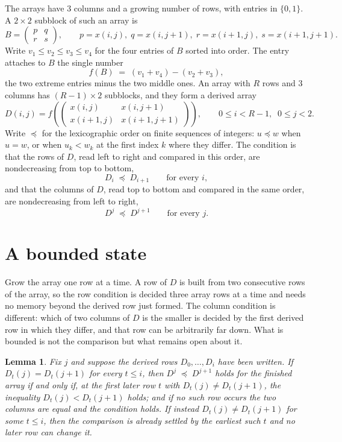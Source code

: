 \documentclass[11pt,a4paper]{article}
\theoremstyle{plain}
\newtheorem{lemma}[theorem]{Lemma}
\theoremstyle{definition}
\begin{document}
The arrays have $3$ columns and a growing number of rows, with entries in $\{0,1\}$. A
$2\times2$ subblock of such an array is
\[
B=\begin{pmatrix} p & q \\ r & s \end{pmatrix},
\qquad p=x(i,j),\; q=x(i,j+1),\; r=x(i+1,j),\; s=x(i+1,j+1).
\]
Write $v_1\le v_2\le v_3\le v_4$ for the four entries of $B$ sorted into order. The entry attaches to $B$ the single number
\[
f(B)\;=\;(v_1+v_4)-(v_2+v_3),
\]
the two extreme entries minus the two middle ones. An array with $R$ rows and $3$ columns has $(R-1)\times2$ subblocks, and they
form a derived array
\[
D(i,j)=f\!\left(\begin{pmatrix} x(i,j) & x(i,j+1) \\ x(i+1,j) & x(i+1,j+1)\end{pmatrix}
\right),\qquad 0\le i<R-1,\;\; 0\le j<2 .
\]
Write $\preceq$ for the lexicographic order on finite sequences of integers: $u\preceq w$ when
$u=w$, or when $u_k<w_k$ at the first index $k$ where they differ. The condition is that the
rows of $D$, read left to right and compared in this order, are nondecreasing from top to bottom,
\[
D_{i}\;\preceq\;D_{i+1}\qquad\text{for every } i,
\]
and that the columns of $D$, read top to bottom and compared in the same order, are nondecreasing
from left to right,
\[
D^{j}\;\preceq\;D^{j+1}\qquad\text{for every } j .
\]

\section{A bounded state}

Grow the array one row at a time. A row of $D$ is built from two consecutive rows of the array,
so the row condition is decided three array rows at a time and needs no memory beyond the
derived row just formed. The column condition is different: which of two columns of $D$ is the
smaller is decided by the first derived row in which they differ, and that row can be
arbitrarily far down. What is bounded is not the comparison but what remains open about it.

\begin{lemma}\label{lem:bits}
Fix $j$ and suppose the derived rows $D_0,\dots,D_i$ have been written. If $D_t(j)=D_t(j+1)$ for
every $t\le i$, then $D^{j}\;\preceq\;D^{j+1}$ holds for the finished array if and only if,
at the first later row $t$ with $D_t(j)\neq D_t(j+1)$, the inequality $D_t(j)<D_t(j+1)$
holds; and if no such row occurs the two columns are equal and the condition holds. If instead
$D_t(j)\neq D_t(j+1)$ for some $t\le i$, then the comparison is already settled by the earliest
such $t$ and no later row can change it.
\end{lemma}
\end{document}
